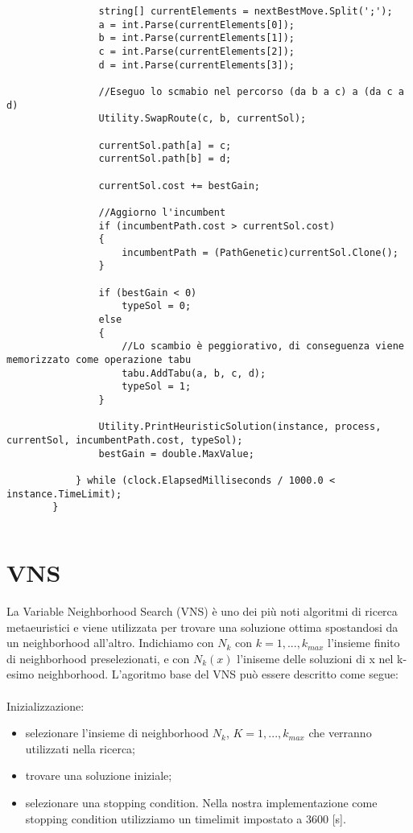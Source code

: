 \begin{lstlisting}
                string[] currentElements = nextBestMove.Split(';');
                a = int.Parse(currentElements[0]);
                b = int.Parse(currentElements[1]);
                c = int.Parse(currentElements[2]);
                d = int.Parse(currentElements[3]);

                //Eseguo lo scmabio nel percorso (da b a c) a (da c a d)
                Utility.SwapRoute(c, b, currentSol);

                currentSol.path[a] = c;
                currentSol.path[b] = d;

                currentSol.cost += bestGain;

                //Aggiorno l'incumbent
                if (incumbentPath.cost > currentSol.cost)
                {
                    incumbentPath = (PathGenetic)currentSol.Clone();
                }

                if (bestGain < 0)
                    typeSol = 0;
                else
                {
                    //Lo scambio è peggiorativo, di conseguenza viene memorizzato come operazione tabu
                    tabu.AddTabu(a, b, c, d);
                    typeSol = 1;
                }

                Utility.PrintHeuristicSolution(instance, process, currentSol, incumbentPath.cost, typeSol);
                bestGain = double.MaxValue;

            } while (clock.ElapsedMilliseconds / 1000.0 < instance.TimeLimit);
        }
\end{lstlisting}

\begin{lstlisting}

\end{lstlisting}

\chapter{VNS}
La Variable Neighborhood Search (VNS) è uno dei più noti algoritmi di ricerca metaeuristici e viene utilizzata per trovare una soluzione ottima spostandosi da un neighborhood all'altro.
Indichiamo con $N_k$ con $k=1,...,k_{max}$ l'insieme finito di neighborhood preselezionati, e con $N_k(x)$ l'iniseme delle soluzioni di x nel k-esimo neighborhood. L'agoritmo base del VNS può essere descritto come segue:\\\\

Inizializzazione: 
\begin{itemize}
\item selezionare l'insieme di neighborhood $N_k$, $K=1,...,k_{max}$ che verranno utilizzati nella ricerca;
\item trovare una soluzione iniziale;
\item selezionare una stopping condition. Nella nostra implementazione come stopping condition utilizziamo un timelimit impostato a 3600 [s].
\end{itemize} 

